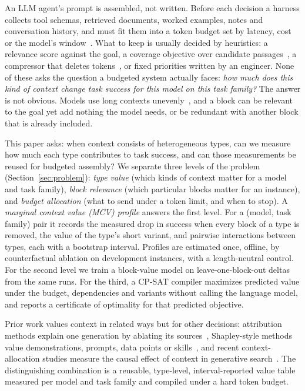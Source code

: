An LLM agent's prompt is assembled, not written. Before each decision a harness collects tool schemas, retrieved
documents, worked examples, notes and conversation history, and must fit them into a token budget set by latency, cost or
the model's window~\citep{cesurvey2025}. What to keep is usually decided by heuristics: a relevance score against the
goal, a coverage objective over candidate passages~\citep{pacms2026}, a compressor that deletes tokens~\citep{llmlingua2_2024},
or fixed priorities written by an engineer. None of these asks the question a budgeted system actually faces:
\emph{how much does this kind of context change task success for this model on this task family?} The answer is not
obvious. Models use long contexts unevenly~\citep{lostmiddle2024}, and a block can be relevant to the goal yet add
nothing the model needs, or be redundant with another block that is already included.

This paper asks: when context consists of heterogeneous types, can we measure how much each type contributes to task
success, and can those measurements be reused for budgeted assembly? We separate three levels of the problem
(Section~\ref{sec:problem}): \emph{type value} (which kinds of context matter for a model and task family),
\emph{block relevance} (which particular blocks matter for an instance), and \emph{budget allocation} (what to send under a
token limit, and when to stop). A \emph{marginal context value (MCV) profile} answers the first level. For a (model, task
family) pair it records the measured drop in success when every block of a type is removed, the value of the type's
short variant, and pairwise interactions between types, each with a bootstrap interval. Profiles are estimated once,
offline, by counterfactual ablation on development instances, with a length-neutral control. For the second level we
train a block-value model on leave-one-block-out deltas from the same runs. For the third, a CP-SAT compiler maximizes
predicted value under the budget, dependencies and variants without calling the language model, and reports a
certificate of optimality for that predicted objective.

Prior work values context in related ways but for other decisions: attribution methods explain one generation by
ablating its sources~\citep{contextcite2024,attribot2024}, Shapley-style methods value demonstrations, prompts, data
points or skills~\citep{demoshapley2024,promptshapley2023,datashapley2019,skillsv2026}, and recent context-allocation
studies measure the causal effect of context in generative search~\citep{ctxalloc2026}. The distinguishing combination is a reusable,
type-level, interval-reported value table measured per model and task family and compiled under a hard token budget.


